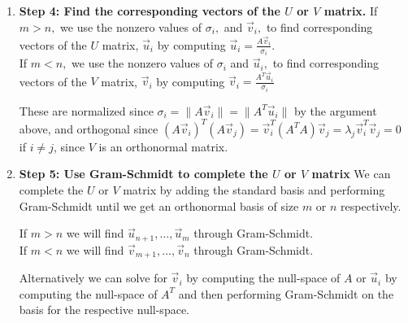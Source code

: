 \begin{enumerate}[label=(\roman*)]
  \item \textbf{Step 4: Find the corresponding vectors of the $U$ or $V$ matrix.}  \vskip 1pt
  If $m > n,$ we use the nonzero values of $\sigma_i,$ and $\vec{v}_i,$ to find corresponding vectors of the $U$ matrix, $\vec{u}_i$ by computing $\vec{u}_i = \frac{A\vec{v}_i}{\sigma_i}$. \\
  If $m < n,$ we use the nonzero values of $\sigma_i$ and $\vec{u}_i,$ to find corresponding vectors of the $V$ matrix, $\vec{v}_i$ by computing $\vec{v}_i = \frac{A^{T} \vec{u}_i}{\sigma_i}$

  These are normalized since $\sigma_i = \|A \vec{v}_i\| = \|A^{T} \vec{u}_i \|$ by the argument above, and orthogonal since $(A\vec{v}_i)^T(A\vec{v}_j) = \vec{v}_i^T(A^T A)\vec{v}_j = \lambda_j \vec{v}_i^T\vec{v}_j = 0$ if $i \neq j$, since $V$ is an orthonormal matrix.

  \item \textbf{Step 5: Use Gram-Schmidt to complete the $U$ or $V$ matrix} \vskip 1pt
  We can complete the $U$ or $V$ matrix by adding the standard basis and performing Gram-Schmidt until we get an orthonormal basis of size $m$ or $n$ respectively.

  If $m > n$ we will find $\vec{u}_{n + 1}, \ldots, \vec{u}_{m}$ through Gram-Schmidt. \\
  If $m < n$ we will find $\vec{v}_{m + 1}, \ldots, \vec{v}_{n}$ through Gram-Schmidt.

  Alternatively we can solve for $\vec{v}_{i}$ by computing the null-space of $A$ or $\vec{u}_{i}$ by computing the null-space of $A^{T}$ and then performing Gram-Schmidt on the basis for the respective null-space.

\end{enumerate}

